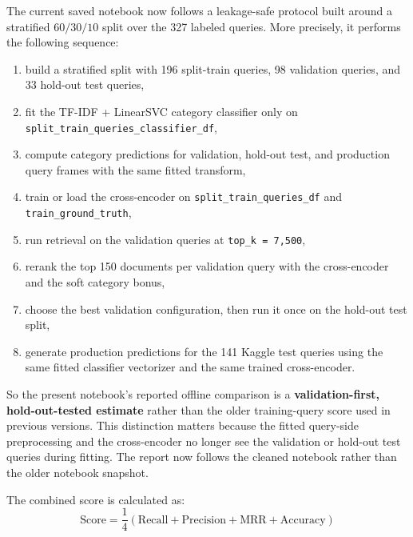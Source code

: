 \documentclass[11pt,a4paper]{article}
\begin{document}
The current saved notebook now follows a leakage-safe protocol built around a stratified \(60/30/10\) split over the 327 labeled queries. More precisely, it performs the following sequence:
\begin{enumerate}
    \item build a stratified split with 196 split-train queries, 98 validation queries, and 33 hold-out test queries,
    \item fit the TF-IDF + LinearSVC category classifier only on \texttt{split\_train\_queries\_classifier\_df},
    \item compute category predictions for validation, hold-out test, and production query frames with the same fitted transform,
    \item train or load the cross-encoder on \texttt{split\_train\_queries\_df} and \texttt{train\_ground\_truth},
    \item run retrieval on the validation queries at \texttt{top\_k = 7,500},
    \item rerank the top 150 documents per validation query with the cross-encoder and the soft category bonus,
    \item choose the best validation configuration, then run it once on the hold-out test split,
    \item generate production predictions for the 141 Kaggle test queries using the same fitted classifier vectorizer and the same trained cross-encoder.
\end{enumerate}

So the present notebook's reported offline comparison is a \textbf{validation-first, hold-out-tested estimate} rather than the older training-query score used in previous versions. This distinction matters because the fitted query-side preprocessing and the cross-encoder no longer see the validation or hold-out test queries during fitting. The report now follows the cleaned notebook rather than the older notebook snapshot.

The combined score is calculated as:
\[
\text{Score} = \frac{1}{4}\left(\text{Recall} + \text{Precision} + \text{MRR} + \text{Accuracy}\right)
\]
\end{document}
